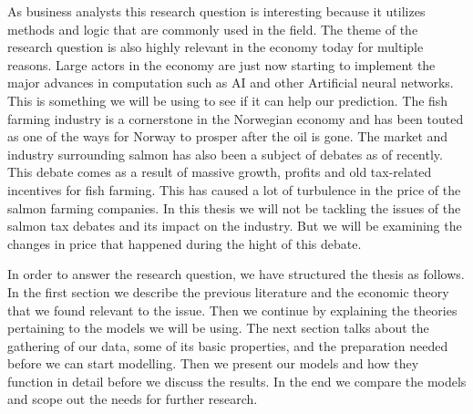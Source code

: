 As business analysts this research question is interesting because it utilizes methods and logic that are commonly used in the field. The theme of the research question is also highly relevant in the economy today for multiple reasons. Large actors in the economy are just now starting to implement the major advances in computation such as AI and other Artificial neural networks. This is something we will be using to see if it can help our prediction. The fish farming industry is a cornerstone in the Norwegian economy and has been touted as one of the ways for Norway to prosper after the oil is gone. The market and industry surrounding salmon has also been a subject of debates as of recently. This debate comes as a result of massive growth, profits and old tax-related incentives for fish farming. This has caused a lot of turbulence in the price of the salmon farming companies. In this thesis we will not be tackling the issues of the salmon tax debates and its impact on the industry. But we will be examining the changes in price that happened during the hight of this debate.

In order to answer the research question, we have structured the thesis as follows. In the first section we describe the previous literature and the economic theory that we found relevant to the issue. Then we continue by explaining the theories pertaining to the models we will be using. The next section talks about the gathering of our data, some of its basic properties, and the preparation needed before we can start modelling. Then we present our models and how they function in detail before we discuss the results. In the end we compare the models and scope out the needs for further research. 
